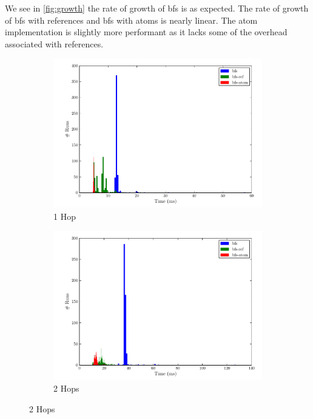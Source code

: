 				We see in \cref{fig:growth} the rate of growth of \gls{bfs} is as expected.  The rate of growth of \gls{bfs} with references and \gls{bfs} with atoms is nearly linear.  The atom implementation is slightly more performant as it lacks some of the overhead associated with references.
				
				\begin{figure}[H]
					\begin{subfigure}[b]{.5\linewidth}
						\includegraphics[scale=0.45]{figures/charts/1_hops.pdf}
						\caption{1 Hop}
						\label{subfig:1-hop}
					\end{subfigure}
					\begin{subfigure}[b]{.5\linewidth}
						\includegraphics[scale=0.45]{figures/charts/2_hops.pdf}
						\caption{2 Hops}
						\label{subfig:2-hops}
					\end{subfigure}
				\end{figure}
